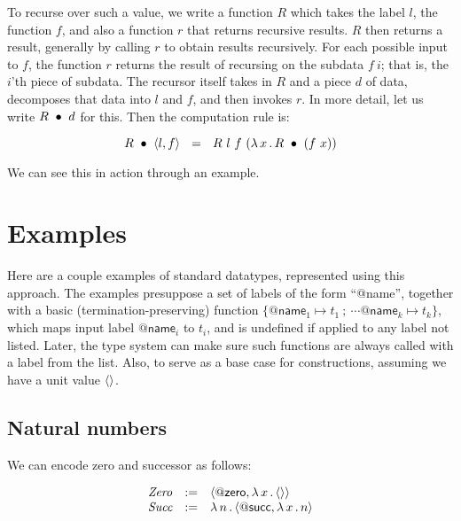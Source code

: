\documentclass{article}
\begin{document}
To recurse over such a value, we write a function $R$ which takes the
label $l$, the function $f$, and also a function $r$ that returns
recursive results.  $R$ then returns a result, generally by calling
$r$ to obtain results recursively.  For each possible input to $f$,
the function $r$ returns the result of recursing on the subdata
$f\ i$; that is, the $i$'th piece of subdata.  The recursor itself
takes in $R$ and a piece $d$ of data, decomposes that data into $l$ and $f$,
and then invokes $r$.  In more detail, let us write $R\ \bullet\ d$
for this.  Then the computation rule is:

\[
\wrec{R}{\ctor{l}{f}} \ \ = \ \ R\ l\ f\ (\lam{x}{\wrec{R}{(f\ x)}})
\]

\noindent We can see this in action through an example.

\section{Examples}

Here are a couple examples of standard datatypes, represented using
this approach.  The examples presuppose a set of labels of the form
``\textsf{@name}'', together with a basic (termination-preserving)
function $\{\textsf{@name}_1 \mapsto t_1\ ;\ \cdots \textsf{@name}_k
\mapsto t_k\}$, which maps input label $\textsf{@name}_i$ to $t_i$,
and is undefined if applied to any label not listed.  Later, the type
system can make sure such functions are always called with a label
from the list.  Also, to serve as a base case for constructions,
assuming we have a unit value $\langle\rangle$.

\subsection{Natural numbers}

We can encode zero and successor as follows:

\[
\begin{array}{lll}
  \textit{Zero} & := & \langle \mathsf{@zero} , \lambda\, x\, .\, \langle\rangle \rangle \\
  \textit{Succ} & := & \lambda\, n\, .\, \langle \mathsf{@succ} , \lambda\, x\, .\, n \rangle
\end{array}
\]
\end{document}
